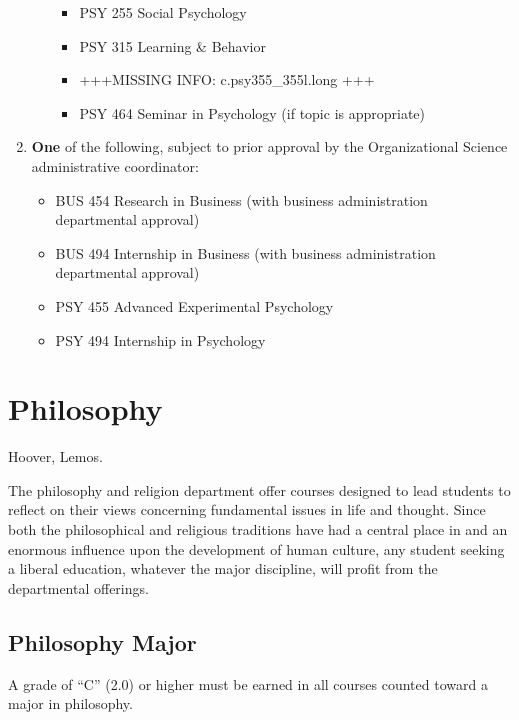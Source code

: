 \documentclass[
  letterpaper,
]{scrbook}
\providecommand{\tightlist}{%
  \setlength{\itemsep}{0pt}\setlength{\parskip}{0pt}}
\begin{document}
\begin{enumerate}
\begin{enumerate}
    \begin{itemize}
    \tightlist
    \item
      PSY 255 Social Psychology
    \item
      PSY 315 Learning \& Behavior
    \item
      +++MISSING INFO: c.psy355\_355l.long +++
    \item
      PSY 464 Seminar in Psychology (if topic is appropriate)
    \end{itemize}
  \end{enumerate}
\item
  \textbf{One} of the following, subject to prior approval by the
  Organizational Science administrative coordinator:

  \begin{itemize}
  \tightlist
  \item
    BUS 454 Research in Business (with business administration
    departmental approval)
  \item
    BUS 494 Internship in Business (with business administration
    departmental approval)
  \item
    PSY 455 Advanced Experimental Psychology
  \item
    PSY 494 Internship in Psychology
  \end{itemize}
\end{enumerate}

\section{Philosophy}\label{philosophy}

Hoover, Lemos.

The philosophy and religion department offer courses designed to lead
students to reflect on their views concerning fundamental issues in life
and thought. Since both the philosophical and religious traditions have
had a central place in and an enormous influence upon the development of
human culture, any student seeking a liberal education, whatever the
major discipline, will profit from the departmental offerings.

\subsection{Philosophy Major}\label{philosophy-major}

A grade of ``C'' (2.0) or higher must be earned in all courses counted
toward a major in philosophy.
\end{document}
